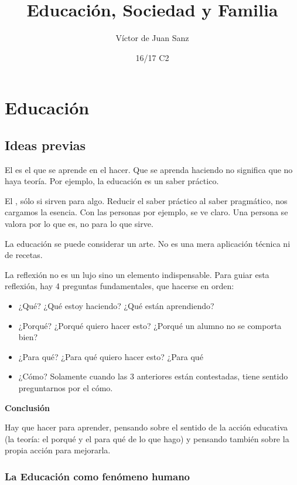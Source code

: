 \documentclass[palatino]{apuntesURJC}
\title{Educación, Sociedad y Familia}
\author{Víctor de Juan Sanz}
\date{16/17 C2}
\begin{document}
\pagestyle{plain}
\maketitle

\tableofcontents
\newpage


\chapter{Educación}

\section{Ideas previas}

El  es el que se aprende en el hacer.
%
Que se aprenda haciendo no significa que no haya teoría.
%
Por ejemplo, la educación es un saber práctico.


El , sólo si sirven para algo.
%
Reducir el saber práctico al saber pragmático, nos cargamos la esencia.
%
Con las personas por ejemplo, se ve claro.
%
Una persona se valora por lo que es, no para lo que sirve.


La educación se puede considerar un arte.
%
No es una mera aplicación técnica ni de recetas.

La reflexión no es un lujo sino un elemento indispensable.
%
Para guiar esta reflexión, hay 4 preguntas fundamentales, que hacerse en orden:
%
\begin{itemize}
	\item ¿Qué? ¿Qué estoy haciendo? ¿Qué están aprendiendo?
	\item ¿Porqué? ¿Porqué quiero hacer esto? ¿Porqué un alumno no se comporta bien?
	\item ¿Para qué? ¿Para qué quiero hacer esto? ¿Para qué
	\item ¿Cómo? \subitem Solamente cuando las 3 anteriores están contestadas, tiene sentido preguntarnos por el cómo.
\end{itemize}



\textbf{Conclusión}

Hay que hacer para aprender, pensando sobre el sentido de la acción educativa (la teoría: el porqué y el para qué de lo que hago) y pensando también sobre la propia acción para mejorarla.

\subsection{La Educación como fenómeno humano}
\end{document}
